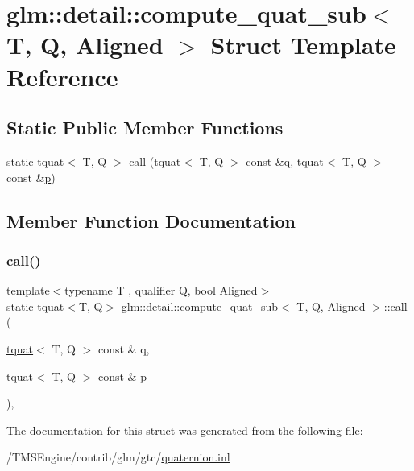 \hypertarget{structglm_1_1detail_1_1compute__quat__sub}{}\section{glm\+:\+:detail\+:\+:compute\+\_\+quat\+\_\+sub$<$ T, Q, Aligned $>$ Struct Template Reference}
\label{structglm_1_1detail_1_1compute__quat__sub}
\subsection*{Static Public Member Functions}
\begin{DoxyCompactItemize}
\item 
static \hyperlink{structglm_1_1tquat}{tquat}$<$ T, Q $>$ \hyperlink{structglm_1_1detail_1_1compute__quat__sub_ac0bcb0d1dd7a6392e90d50328f304cdf}{call} (\hyperlink{structglm_1_1tquat}{tquat}$<$ T, Q $>$ const \&\hyperlink{_s_d_l__opengl_8h_a8fc1e7b9baaae687804c7eed46ca09c6}{q}, \hyperlink{structglm_1_1tquat}{tquat}$<$ T, Q $>$ const \&\hyperlink{_s_d_l__opengl__glext_8h_aa5367c14d90f462230c2611b81b41d23}{p})
\end{DoxyCompactItemize}


\subsection{Member Function Documentation}
\mbox{\label{structglm_1_1detail_1_1compute__quat__sub_ac0bcb0d1dd7a6392e90d50328f304cdf}} 
\subsubsection{\texorpdfstring{call()}{call()}}
{\footnotesize\ttfamily template$<$typename T , qualifier Q, bool Aligned$>$ \\
static \hyperlink{structglm_1_1tquat}{tquat}$<$T, Q$>$ \hyperlink{structglm_1_1detail_1_1compute__quat__sub}{glm\+::detail\+::compute\+\_\+quat\+\_\+sub}$<$ T, Q, Aligned $>$\+::call (\begin{DoxyParamCaption}\item[{\hyperlink{structglm_1_1tquat}{tquat}$<$ T, Q $>$ const \&}]{q,  }\item[{\hyperlink{structglm_1_1tquat}{tquat}$<$ T, Q $>$ const \&}]{p }\end{DoxyParamCaption})\hspace{0.3cm}{\ttfamily [inline]}, {\ttfamily [static]}}



The documentation for this struct was generated from the following file\+:\begin{DoxyCompactItemize}
\item 
/\+T\+M\+S\+Engine/contrib/glm/gtc/\hyperlink{gtc_2quaternion_8inl}{quaternion.\+inl}\end{DoxyCompactItemize}
